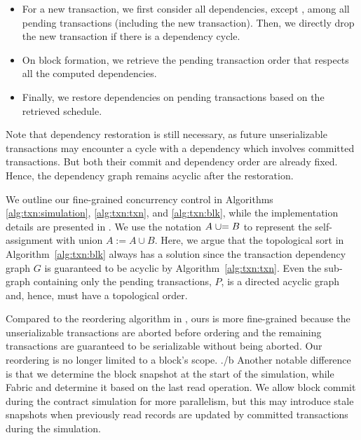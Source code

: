 {\begin{itemize}

\item For a new transaction, we first consider all dependencies, except
  , among all pending transactions (including the new
  transaction).
  Then, we directly drop the new transaction if there is a dependency cycle.

\item On block formation, we retrieve the pending transaction order that
  respects all the computed dependencies.

\item Finally, we restore  dependencies on pending transactions
  based on the retrieved schedule.

\end{itemize}

Note that  dependency restoration is still necessary, 
%
as future unserializable transactions may encounter a cycle with a 
dependency which involves committed transactions. 
%
But both their commit and dependency order are already fixed.
%
Hence, the dependency graph remains acyclic after the restoration.

We outline our fine-grained concurrency control in Algorithms \ref{alg:txn:simulation}, \ref{alg:txn:txn}, and \ref{alg:txn:blk}, while the implementation details are presented in .
%
We use the notation $A \mathrel{{\cup}{=}} B$ to represent the self-assignment with union $A := A \cup B$.
%
Here, we argue that the topological sort in Algorithm~\ref{alg:txn:blk} always has a solution
since the transaction dependency graph $G$ is guaranteed to be acyclic by Algorithm~\ref{alg:txn:txn}.
%
Even the sub-graph containing only the pending transactions, $P$, is a directed
acyclic graph and, hence, must have a topological order.

Compared to the reordering algorithm in {\fabricPlusplus}, ours is more fine-grained
because the unserializable transactions are aborted before ordering and the
remaining transactions are guaranteed to be serializable without being aborted.
%
Our reordering is no longer limited to a block's scope.
./b
Another notable difference is that we determine the block snapshot at the start
of the simulation, while Fabric and {\fabricPlusplus} determine it based on the last read
operation.
%
We allow block commit during the contract simulation for more
parallelism, but this may introduce stale snapshots when previously read records
are updated by committed transactions during the simulation.

}
